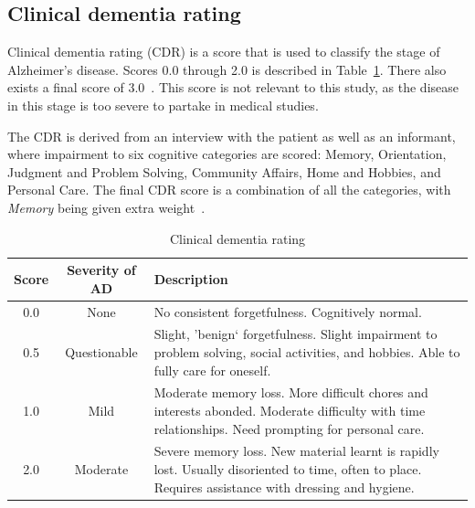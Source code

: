\documentclass{kththesis}
\renewcommand{\arraystretch}{1.2}
\begin{document}
\subsection{Clinical dementia rating}
Clinical dementia rating (CDR) is a score that is used to classify the stage of Alzheimer’s disease. Scores 0.0 through 2.0 is described in Table~\ref{tab:cdr_definition}. There also exists a final score of 3.0~\cite{cdr}. This score is not relevant to this study, as the disease in this stage is too severe to partake in medical studies.

The CDR is derived from an interview with the patient as well as an informant, where impairment to six cognitive categories are scored: Memory, Orientation, Judgment and Problem Solving, Community Affairs, Home and Hobbies, and Personal Care. The final CDR score is a combination of all the categories, with \textit{Memory} being given extra weight~\cite{cdr}.

\begin{table}[h]
  \renewcommand{\arraystretch}{1.2}
  \begin{center}
    \caption{Clinical dementia rating}
    \label{tab:cdr_definition}
    \begin{tabularx}{\textwidth}{c|cX}
      \textbf{Score} & \textbf{Severity of AD} & \textbf{Description} \\
      \toprule
      0.0 & None & No consistent forgetfulness. Cognitively normal. \\
      0.5 & Questionable & Slight, 'benign` forgetfulness. Slight impairment to problem solving, social activities, and hobbies. Able to fully care for oneself. \\
      1.0 & Mild & Moderate memory loss. More difficult chores and interests abonded. Moderate difficulty with time relationships. Need prompting for personal care. \\
      2.0 & Moderate & Severe memory loss. New material learnt is rapidly lost. Usually disoriented to time, often to place. Requires assistance with dressing and hygiene. \\
    \end{tabularx}
  \end{center}
\end{table}
\end{document}
